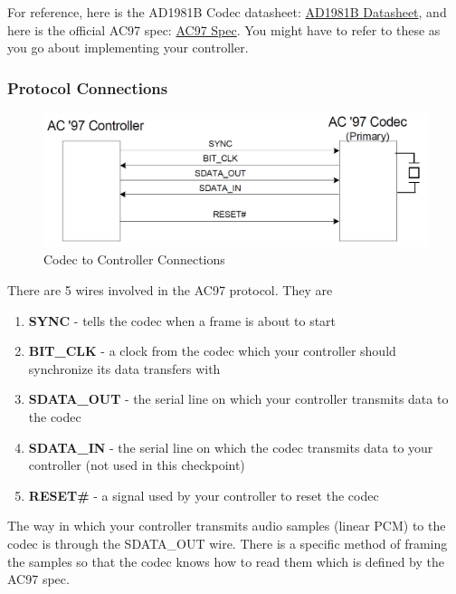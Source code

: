 \documentclass[11pt]{article}
\begin{document}
For reference, here is the AD1981B Codec datasheet: \href{http://www.xilinx.com/products/boards/ml505/datasheets/87560554AD1981B_c.pdf}{AD1981B Datasheet}, and here is the official AC97 spec: \href{http://download.intel.com/support/motherboards/desktop/sb/ac97_r23.pdf}{AC97 Spec}. You might have to refer to these as you go about implementing your controller. \\

\subsubsection{Protocol Connections}

\begin{figure}[hbt]
	\begin{center}
		\includegraphics[width=6in]{ac97_connections}
		\caption{Codec to Controller Connections}
	\end{center}
\end{figure}

There are 5 wires involved in the AC97 protocol. They are

\begin{enumerate}
	\item \textbf{SYNC} - tells the codec when a frame is about to start
	\item \textbf{BIT\_CLK} - a clock from the codec which your controller should synchronize its data transfers with
	\item \textbf{SDATA\_OUT} - the serial line on which your controller transmits data to the codec
	\item \textbf{SDATA\_IN} - the serial line on which the codec transmits data to your controller (not used in this checkpoint)
	\item \textbf{RESET\#} - a signal used by your controller to reset the codec
\end{enumerate}

The way in which your controller transmits audio samples (linear PCM) to the codec is through the SDATA\_OUT wire. There is a specific method of framing the samples so that the codec knows how to read them which is defined by the AC97 spec. \\
\end{document}
